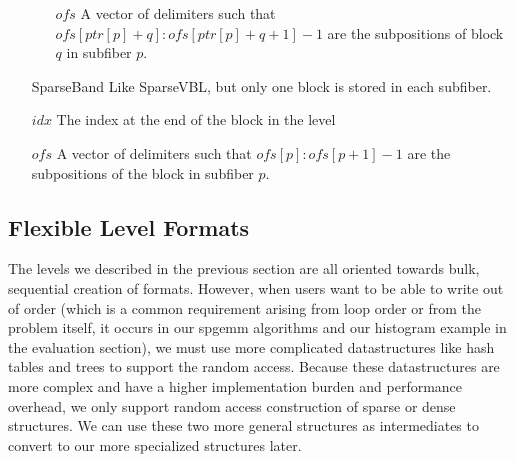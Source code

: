 \begin{enumerate}
\begin{enumerate}
        \item[$ofs$] A vector of delimiters such that $ofs[ptr[p] + q]:ofs[ptr[p] + q + 1] - 1$ are the subpositions of block $q$ in subfiber $p$.
    \end{enumerate}
\item[SparseBand]
    Like SparseVBL, but only one block is stored in each subfiber.
        \item[$idx$] The index at the end of the block in the level
        \item[$ofs$] A vector of delimiters such that $ofs[p]:ofs[p + 1] - 1$ are the subpositions of the block in subfiber $p$.
\end{enumerate}


\subsection{Flexible Level Formats}
The levels we described in the previous section are all oriented towards bulk,
sequential creation of formats. However, when users want to be able to write out
of order (which is a common requirement arising from loop order or from the
problem itself, it occurs in our spgemm algorithms and our histogram example in
the evaluation section), we must use more complicated datastructures like hash
tables and trees to support the random access. Because these datastructures are
more complex and have a higher implementation burden and performance overhead,
we only support random access construction of sparse or dense structures.  We
can use these two more general structures as intermediates to convert to our
more specialized structures later.


